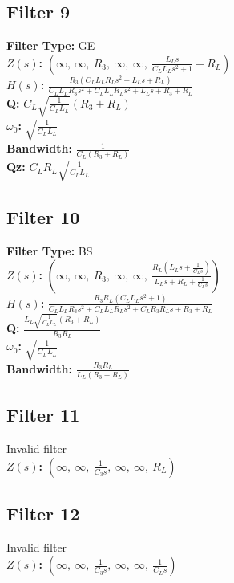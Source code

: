 \documentclass{article}
\begin{document}
\subsection*{Filter 9}
\textbf{Filter Type:} GE \\ 
\textbf{$Z(s)$:} $\left( \infty, \  \infty, \  R_{3}, \  \infty, \  \infty, \  \frac{L_{L} s}{C_{L} L_{L} s^{2} + 1} + R_{L}\right)$ \\ 
\textbf{$H(s)$:} $\frac{R_{3} \left(C_{L} L_{L} R_{L} s^{2} + L_{L} s + R_{L}\right)}{C_{L} L_{L} R_{3} s^{2} + C_{L} L_{L} R_{L} s^{2} + L_{L} s + R_{3} + R_{L}}$ \\ 
\textbf{Q:} $C_{L} \sqrt{\frac{1}{C_{L} L_{L}}} \left(R_{3} + R_{L}\right)$ \\ 
\textbf{$\omega_0$:} $\sqrt{\frac{1}{C_{L} L_{L}}}$ \\ 
\textbf{Bandwidth:} $\frac{1}{C_{L} \left(R_{3} + R_{L}\right)}$ \\ 
\textbf{Qz:} $C_{L} R_{L} \sqrt{\frac{1}{C_{L} L_{L}}}$ \\ 
\subsection*{Filter 10}
\textbf{Filter Type:} BS \\ 
\textbf{$Z(s)$:} $\left( \infty, \  \infty, \  R_{3}, \  \infty, \  \infty, \  \frac{R_{L} \left(L_{L} s + \frac{1}{C_{L} s}\right)}{L_{L} s + R_{L} + \frac{1}{C_{L} s}}\right)$ \\ 
\textbf{$H(s)$:} $\frac{R_{3} R_{L} \left(C_{L} L_{L} s^{2} + 1\right)}{C_{L} L_{L} R_{3} s^{2} + C_{L} L_{L} R_{L} s^{2} + C_{L} R_{3} R_{L} s + R_{3} + R_{L}}$ \\ 
\textbf{Q:} $\frac{L_{L} \sqrt{\frac{1}{C_{L} L_{L}}} \left(R_{3} + R_{L}\right)}{R_{3} R_{L}}$ \\ 
\textbf{$\omega_0$:} $\sqrt{\frac{1}{C_{L} L_{L}}}$ \\ 
\textbf{Bandwidth:} $\frac{R_{3} R_{L}}{L_{L} \left(R_{3} + R_{L}\right)}$ \\ 
\subsection*{Filter 11}
Invalid filter \\ 
\textbf{$Z(s)$:} $\left( \infty, \  \infty, \  \frac{1}{C_{3} s}, \  \infty, \  \infty, \  R_{L}\right)$ \\ 
\subsection*{Filter 12}
Invalid filter \\ 
\textbf{$Z(s)$:} $\left( \infty, \  \infty, \  \frac{1}{C_{3} s}, \  \infty, \  \infty, \  \frac{1}{C_{L} s}\right)$ \\ 
\end{document}
